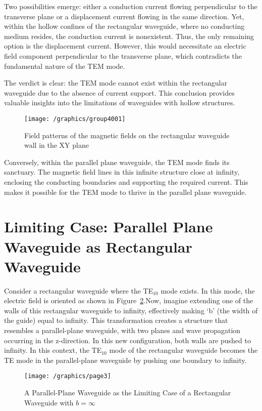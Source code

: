 Two possibilities emerge: either a conduction current flowing perpendicular to the transverse plane or a displacement current flowing in the same direction. Yet, within the hollow confines of the rectangular waveguide, where no conducting medium resides, the conduction current is nonexistent. Thus, the only remaining option is the displacement current. However, this would necessitate an electric field component perpendicular to the transverse plane, which contradicts the fundamental nature of the TEM mode.

The verdict is clear: the TEM mode cannot exist within the rectangular waveguide due to the absence of current support. This conclusion provides valuable insights into the limitations of waveguides with hollow structures.
\begin{figure}[h]
\centering
\texttt{[image: /graphics/group4001]}
\caption{Field patterns of the magnetic fields on the rectangular waveguide wall in the XY plane}
\label{fig:group4001}
\end{figure}

Conversely, within the parallel plane waveguide, the TEM mode finds its sanctuary. The magnetic field lines in this infinite structure close at infinity, enclosing the conducting boundaries and supporting the required current. This makes it possible for the TEM mode to thrive in the parallel plane waveguide.

\section{Limiting Case: Parallel Plane Waveguide as Rectangular Waveguide}
Consider a rectangular waveguide where the TE$_{10}$ mode exists. In this mode, the electric field is oriented as shown in Figure~\ref{fig:page3}.Now, imagine extending one of the walls of this rectangular waveguide to infinity, effectively making `b' (the width of the guide) equal to infinity. This transformation creates a structure that resembles a parallel-plane waveguide, with two planes and wave propagation occurring in the z-direction. In this new configuration, both walls are pushed to infinity. In this context, the TE$_{10}$ mode of the rectangular waveguide becomes the TE mode in the parallel-plane waveguide by pushing one boundary to infinity.
\begin{figure}[h]
\centering
\texttt{[image: /graphics/page3]}
\caption{A Parallel-Plane Waveguide as the Limiting Case of a Rectangular Waveguide with $b=\infty$}
\label{fig:page3}
\end{figure}

